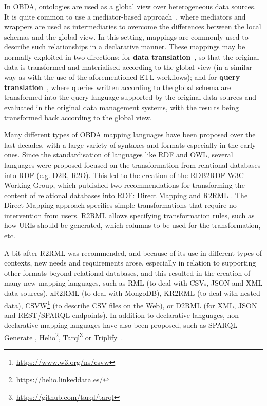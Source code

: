 In OBDA, ontologies are used as a global view over heterogeneous data sources. It is quite common to use a mediator-based approach~\citep{wiederhold1992mediators}, where mediators and wrappers are used as intermediaries to overcome the differences between the local schemas and the global view. In this setting, mappings are commonly used to describe such relationships in a declarative manner. These mappings may be normally exploited in two directions: for \textbf{data translation}~\citep{dimou2014rml}, so that the original data is transformed and materialised according to the global view (in a similar way as with the use of the aforementioned ETL workflows); and for \textbf{query translation}~\citep{priyatna2014formalisation, rodriguez2015efficient}, where queries written according to the global schema are transformed into the query language supported by the original data sources and evaluated in the original data management systems, with the results being transformed back according to the global view.  

Many different types of OBDA mapping languages have been proposed over the last decades, with a large variety of syntaxes and formats especially in the early ones. Since the standardisation of languages like RDF and OWL, several languages were proposed focused on the transformation from relational databases into RDF (e.g. D2R, R2O). This led to the creation of the RDB2RDF W3C Working Group, which published two recommendations for transforming the content of relational databases into RDF: Direct Mapping \citep{arenas2013direct} and R2RML \citep{R2RML}. The Direct Mapping approach specifies simple transformations that require no intervention from users. R2RML allows specifying transformation rules, such as how URIs should be generated, which columns to be used for the transformation, etc.

A bit after R2RML was recommended, and because of its use in different types of contexts, new needs and requirements arose, especially in relation to supporting other formats beyond relational databases, and this resulted in the creation of many new mapping languages, such as RML \citep{dimou2014rml} (to deal with CSVs, JSON and XML data sources), xR2RML \citep{michel2015translation} (to deal with MongoDB), KR2RML \citep{slepicka2015kr2rml} (to deal with nested data), CSVW\footnote{\url{https://www.w3.org/ns/csvw}} (to describe CSV files on the Web), or D2RML \citep{chortaras2018d2rml} (for XML, JSON and REST/SPARQL endpoints). In addition to declarative languages, non-declarative mapping languages have also been proposed, such as SPARQL-Generate \citep{lefranccois2017sparql}, Helio\footnote{\url{https://helio.linkeddata.es/}},  Tarql\footnote{\url{https://github.com/tarql/tarql}} or Triplify~\citep{auer2009triplify}.

